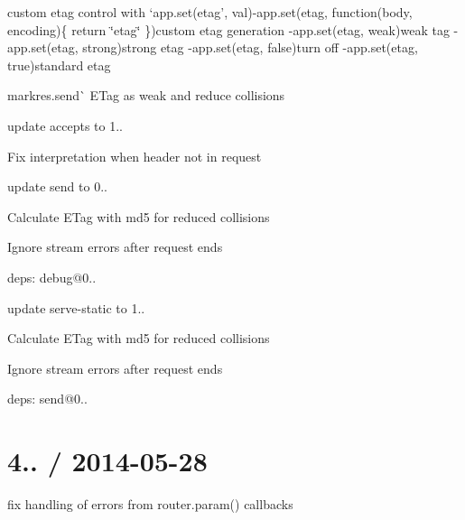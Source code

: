 {\ttfamily 
\begin{DoxyItemize}
\item custom etag control with `app.\+set(\textquotesingle{}etag', val){\ttfamily  -\/}app.\+set(\textquotesingle{}etag\textquotesingle{}, function(body, encoding)\{ return \textquotesingle{}\char`\"{}etag\char`\"{}\textquotesingle{} \}){\ttfamily custom etag generation -\/}app.\+set(\textquotesingle{}etag\textquotesingle{}, \textquotesingle{}weak\textquotesingle{}){\ttfamily weak tag -\/}app.\+set(\textquotesingle{}etag\textquotesingle{}, \textquotesingle{}strong\textquotesingle{}){\ttfamily strong etag -\/}app.\+set(\textquotesingle{}etag\textquotesingle{}, false){\ttfamily turn off -\/}app.\+set(\textquotesingle{}etag\textquotesingle{}, true){\ttfamily standard etag}
\item {\ttfamily mark}res.\+send\`{} E\+Tag as weak and reduce collisions
\item update accepts to 1..
\begin{DoxyItemize}
\item Fix interpretation when header not in request
\end{DoxyItemize}
\item update send to 0..
\begin{DoxyItemize}
\item Calculate E\+Tag with md5 for reduced collisions
\item Ignore stream errors after request ends
\item deps\+: debug@0..
\end{DoxyItemize}
\item update serve-\/static to 1..
\begin{DoxyItemize}
\item Calculate E\+Tag with md5 for reduced collisions
\item Ignore stream errors after request ends
\item deps\+: send@0..
\end{DoxyItemize}
\end{DoxyItemize}}

{\ttfamily \section*{4.. / 2014-\/05-\/28 }}

{\ttfamily }

{\ttfamily 
\begin{DoxyItemize}
\item fix handling of errors from {\ttfamily router.\+param()} callbacks
\end{DoxyItemize}}

